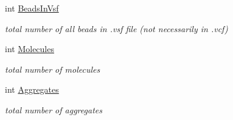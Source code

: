 \begin{DoxyCompactItemize}
\mbox{\label{structCounts_a8090701ea8915684b3e4fe9f1fdd4fa6}} 
int \hyperlink{structCounts_a8090701ea8915684b3e4fe9f1fdd4fa6}{Beads\+In\+Vsf}
\begin{DoxyCompactList}\small\item\em total number of all beads in .vsf file (not necessarily in .vcf) \end{DoxyCompactList}\item 
\mbox{\label{structCounts_af7d0ed6811fc1a83b9e10edbfbbd7108}} 
int \hyperlink{structCounts_af7d0ed6811fc1a83b9e10edbfbbd7108}{Molecules}
\begin{DoxyCompactList}\small\item\em total number of molecules \end{DoxyCompactList}\item 
\mbox{\label{structCounts_af83199d8648f919910921ca15c7a3126}} 
int \hyperlink{structCounts_af83199d8648f919910921ca15c7a3126}{Aggregates}
\begin{DoxyCompactList}\small\item\em total number of aggregates \end{DoxyCompactList}\end{DoxyCompactItemize}
